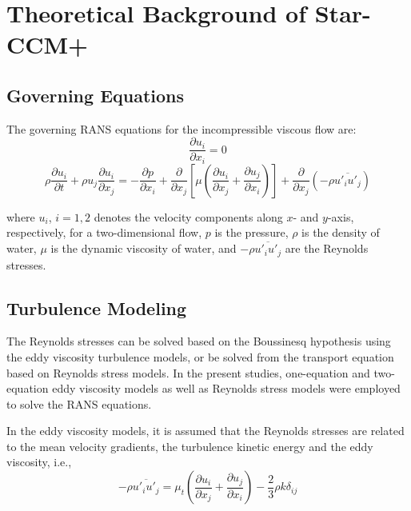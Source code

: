 \documentclass[onecolumn,11pt]{report}
\begin{document}
\chapter{Theoretical Background of Star-CCM+}



\section{Governing Equations}

The governing RANS equations for the incompressible viscous flow are:
\begin{equation}
\frac{\partial u_i}{\partial x_i} = 0
\label{eq1}
\end{equation}  
\begin{equation}
\rho \frac{\partial u_i}{\partial t} + \rho u_j \frac{\partial u_i}{\partial x_j} = -\frac{\partial p}{\partial x_i} + \frac{\partial}{\partial x_j} \left[ \mu \left(\frac{\partial u_i}{\partial x_j} + \frac{\partial u_j}{\partial x_i} \right) \right] + \frac{\partial}{\partial x_j} (-\rho \overline{u'_i u'_j})
\label{eq2}
\end{equation}

where $u_i$, $i=1,2$ denotes the velocity components along $x$- and $y$-axis, respectively, for a two-dimensional flow, $p$ is the pressure, $\rho$ is the density of water, $\mu$ is the dynamic viscosity of water, and $-\rho \overline{u'_i u'_j}$ are the Reynolds stresses. 

\section{Turbulence Modeling}

The Reynolds stresses can be solved based on the Boussinesq hypothesis using the eddy viscosity turbulence models, or be solved from the transport equation based on Reynolds stress models. In the present studies, one-equation and two-equation eddy viscosity models as well as Reynolds stress models were employed to solve the RANS equations.

In the eddy viscosity models, it is assumed that the Reynolds stresses are related to the mean velocity gradients, the turbulence kinetic energy and the eddy viscosity, i.e.,
\begin{equation}
-\rho \overline{u'_i u'_j} = \mu_t \left( \frac{\partial u_i}{\partial x_j} + \frac{\partial u_j}{\partial x_i} \right) - \frac{2}{3}\rho k \delta_{ij}
\label{eq3}
\end{equation}
\end{document}
